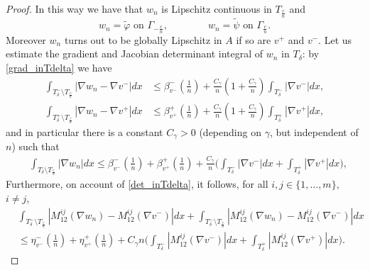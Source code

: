 \documentclass[10pt,a4paper]{amsart}
\newcommand{\R}{\mathbb{R}}
\begin{document}
\begin{proof}
%	
	In this way we have that $w_{n}$ is Lipschitz continuous in $T_{\frac cn}$ and 
	$$w_{n}=\widetilde \varphi \text{ on }\Gamma_{-\frac cn},\qquad \qquad w_{n}=\widetilde \psi \text{ on }\Gamma_{\frac cn}.$$
	Moreover $w_n$ turns out to be globally  Lipschitz in $A$ if so are $v^+$ and $v^-$.
	Let us estimate the gradient and Jacobian determinant integral of $w_{n}$ in $T_{\delta}$: by \eqref{grad_inTdelta}  we have
	\begin{align}\label{gradient1}
	\int_{T^-_\delta\setminus T_{\frac cn}}|\nabla w_{n}-\nabla v^-|dx&\leq   \beta^-_{v^-}(\frac1n)+\frac {C_\gamma}{n}(1+ \frac {C_\gamma}{n})\int_{T_\delta^-} |\nabla v^-|dx,\nonumber\\
	\int_{T^+_\delta\setminus T_{\frac cn}}|\nabla w_{n}-\nabla v^+|dx&\leq   \beta^+_{v^+}(\frac1n)+\frac {C_\gamma}{n}(1+ \frac {C_\gamma}{n})\int_{T_\delta^+} |\nabla v^+|dx,
	\end{align}
and in particular there is a constant $C_\gamma>0$ (depending on $\gamma$, but independent of $n$) such that 
	\begin{align}
	&\int_{T_\delta\setminus T_{\frac cn}}|\nabla w_{n}|dx\leq \beta^-_{v^-}(\frac1n)+  \beta^+_{v^+}(\frac1n)+ \frac { C_\gamma}{n}\Big(\int_{T^-_\delta} |\nabla v^-|dx+\int_{T^+_\delta} |\nabla v^+|dx\Big),\label{257}
\end{align}
Furthermore, 
on account of \eqref{det_inTdelta}, it follows, for all $i,j\in \{1,\dots,m\},$ $i\neq j$,
\begin{align}
&\int_{T_\delta^-\setminus T_{\frac cn}}|M_{12}^{ij}(\nabla w_{n})-M_{12}^{ij}(\nabla v^-)|dx+\int_{T_\delta^-\setminus T_{\frac cn}}|M_{12}^{ij}(\nabla w_{n})-M_{12}^{ij}(\nabla v^-)|dx\nonumber\\
&\leq  \eta^-_{v^-}(\frac1n)+ \eta^+_{v^+}(\frac1n)+{C_\gamma}{n}\Big(\int_{T^-_\delta}|M_{12}^{ij}(\nabla v^-)|dx+\int_{T^+_\delta}|M_{12}^{ij}(\nabla v^+)|dx\Big).\label{258}

\end{align}
\end{proof}
\end{document}

